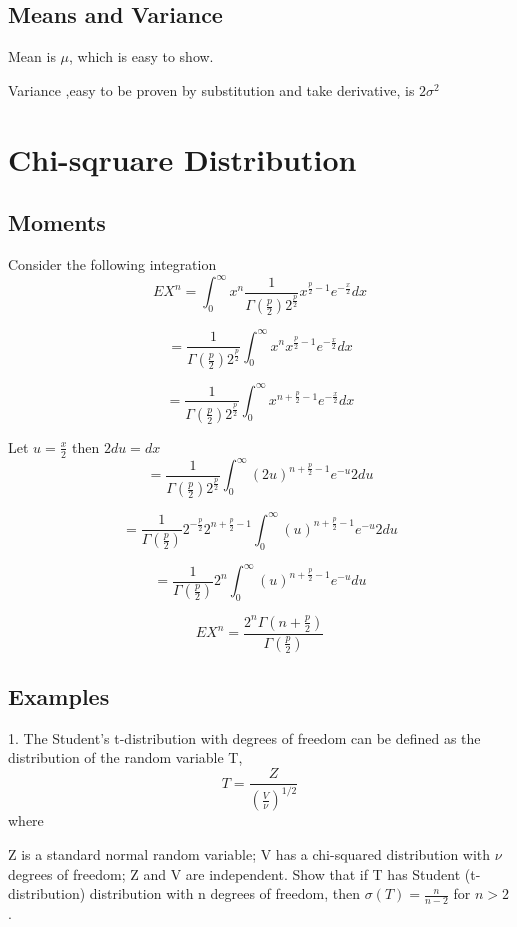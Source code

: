 \documentclass{article}
\begin{document}
\subsection{Means and Variance}

Mean is $\mu$, which is easy to show.

Variance ,easy to be proven by substitution and take derivative, is $2\sigma^2$

\section{Chi-sqruare Distribution}

\subsection{Moments}

Consider the following integration 
$$EX^n = \int_{0}^{\infty} x^n \frac{1}{\Gamma(\frac{p}2)2^{\frac{p}2}} x ^{\frac{p}2-1}e^{-\frac{x}2}dx$$

$$ = \frac{1}{\Gamma(\frac{p}2)2^{\frac{p}2}} \int_{0}^{\infty} x^n  x ^{\frac{p}2-1}e^{-\frac{x}2}dx$$

$$= \frac{1}{\Gamma(\frac{p}2)2^{\frac{p}2}} \int_{0}^{\infty}  x ^{n+\frac{p}2-1}e^{-\frac{x}2}dx$$

Let $u = \frac{x}{2}$ then $2du = dx$
$$= \frac{1}{\Gamma(\frac{p}2)2^{\frac{p}2}} \int_{0}^{\infty}  (2u)^{n+\frac{p}2-1}e^{-u}2du$$

$$= \frac{1}{\Gamma(\frac{p}2)} 2^{-\frac{p}2} 2^{n+\frac{p}2-1} \int_{0}^{\infty}  (u)^{n+\frac{p}2-1}e^{-u}2du$$
 
$$= \frac{1}{\Gamma(\frac{p}2)}  2^{n} \int_{0}^{\infty}  (u)^{n+\frac{p}2-1}e^{-u}du$$

$$EX^n= \frac{2^{n} \Gamma(n+\frac{p}2)}{\Gamma(\frac{p}2)}   $$

\subsection{Examples}

1. The Student's t-distribution with  degrees of freedom can be defined as the distribution of the random variable T,
$$T = \frac{Z}{(\frac{V}{\nu})^{1/2}}$$
where

Z  is a standard normal random variable;
V  has a chi-squared distribution with $\nu$ degrees of freedom;
Z and V are independent.
Show that if T has Student (t-distribution) distribution with n degrees of freedom, then $\sigma{(T)} = \frac{n}{n-2}$ for $n>2$.
\end{document}
